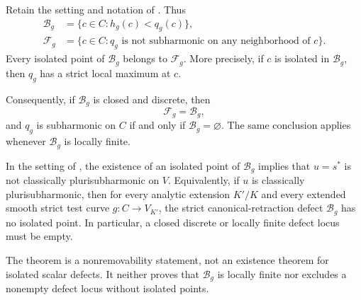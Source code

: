 
\begin{theorem}
\label{thm:p031-isolated-scalar-defect-nonremovability}
Retain the setting and notation of
.  Thus
\[
 \begin{aligned}
 \mathcal B_g&=\{c\in C:h_g(c)<q_g(c)\},\\
 \mathcal F_g&=
 \{c\in C:q_g\text{ is not subharmonic on any neighborhood of }c\}.
 \end{aligned}
\]
Every isolated point of $\mathcal B_g$ belongs to $\mathcal F_g$.
More precisely, if $c$ is isolated in $\mathcal B_g$, then $q_g$
has a strict local maximum at $c$.

Consequently, if $\mathcal B_g$ is closed and discrete, then
\begin{equation}
\label{eq:p031-closed-discrete-scalar-defect-exact-failure}
                         \mathcal F_g=\mathcal B_g,
\end{equation}
and $q_g$ is subharmonic on $C$ if and only if
$\mathcal B_g=\varnothing$.  The same conclusion applies whenever
$\mathcal B_g$ is locally finite.
\end{theorem}

\begin{corollary}
\label{cor:p031-psh-scalar-defect-no-isolated-points}
In the setting of
, the existence of an
isolated point of $\mathcal B_g$ implies that $u=s^*$ is not
classically plurisubharmonic on $V$.  Equivalently, if $u$ is
classically plurisubharmonic, then for every analytic extension $K'/K$
and every extended smooth strict test curve $g:C\to V_{K'}$, the strict
canonical-retraction defect $\mathcal B_g$ has no isolated point.  In
particular, a closed discrete or locally finite defect locus must be empty.
\end{corollary}

The theorem is a nonremovability statement, not an existence theorem for
isolated scalar defects.  It neither proves that $\mathcal B_g$ is locally
finite nor excludes a nonempty defect locus without isolated points.
